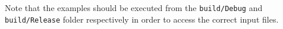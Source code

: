 Note that the examples should be executed from the \texttt{build/Debug} and \texttt{build/Release} folder respectively in order to access the correct input files.























